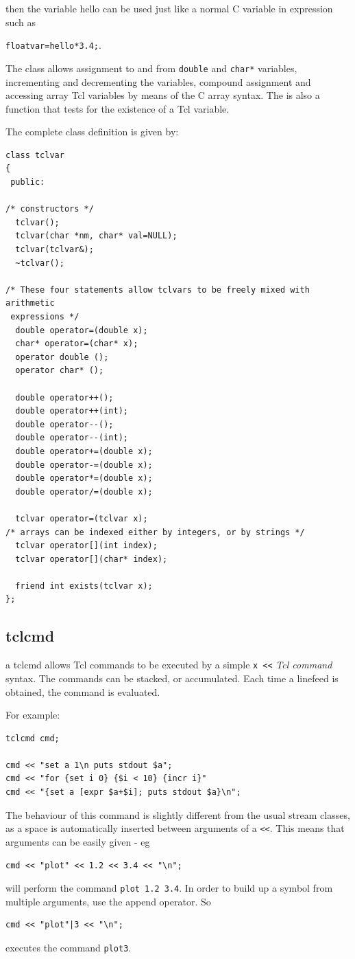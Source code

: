 then the variable hello can be used just like a normal C variable in
expression such as 

\verb|floatvar=hello*3.4;|.

The class allows assignment to and from \verb|double| and \verb|char*|
variables, incrementing and decrementing the variables, compound
assignment and accessing array Tcl variables by means of the C array
syntax. The is also a function that tests for the existence of a Tcl
variable.

\pagebreak[4]
The complete class definition is given by:

\begin{verbatim}
class tclvar
{ 
 public:

/* constructors */
  tclvar();
  tclvar(char *nm, char* val=NULL);
  tclvar(tclvar&);
  ~tclvar();

/* These four statements allow tclvars to be freely mixed with arithmetic 
 expressions */
  double operator=(double x);
  char* operator=(char* x);
  operator double ();
  operator char* ();

  double operator++();
  double operator++(int);
  double operator--();
  double operator--(int); 
  double operator+=(double x);
  double operator-=(double x);
  double operator*=(double x);
  double operator/=(double x);

  tclvar operator=(tclvar x); 
/* arrays can be indexed either by integers, or by strings */
  tclvar operator[](int index);
  tclvar operator[](char* index);

  friend int exists(tclvar x);
};
\end{verbatim}

\subsection{tclcmd}

a tclcmd allows Tcl commands to be executed by a simple \verb|x <<|
{\em Tcl command} syntax. The commands can be stacked, or
accumulated. Each time a linefeed is obtained, the command is
evaluated.

\pagebreak[4]
For example:
\begin{verbatim}
tclcmd cmd;

cmd << "set a 1\n puts stdout $a";
cmd << "for {set i 0} {$i < 10} {incr i}"
cmd << "{set a [expr $a+$i]; puts stdout $a}\n";
\end{verbatim}

The behaviour of this command is slightly different from the usual
stream classes, as a space is automatically inserted between arguments
of a \verb|<<|. This means that arguments can be easily given - eg
\begin{verbatim}
cmd << "plot" << 1.2 << 3.4 << "\n";
\end{verbatim}
will perform the command {\tt plot 1.2 3.4}. In order to build up a
symbol from multiple arguments, use the append operator. So
\begin{verbatim}
cmd << "plot"|3 << "\n";
\end{verbatim} 
executes the command {\tt plot3}.

